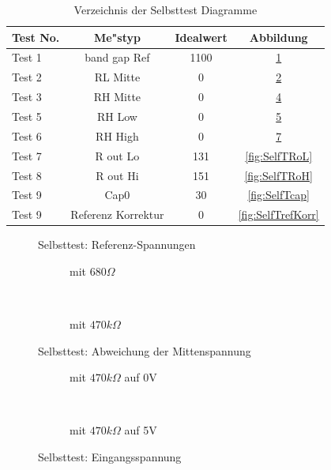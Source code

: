 \begin{table}[H]
  \begin{center}
    \begin{tabular}{| l | c | c | c |}
    \hline
Test No. &  Me"styp    & Idealwert & Abbildung \\
    \hline
    \hline
Test 1 & band gap Ref  & 1100 & \ref{fig:SelfTref} \\
    \hline
Test 2 & RL Mitte & 0 & \ref{fig:SelfTMitL} \\
    \hline
Test 3 & RH Mitte & 0 & \ref{fig:SelfTMitH} \\
    \hline
Test 5 & RH Low &  0 & \ref{fig:SelfTlowH} \\
    \hline
Test 6 & RH High & 0 & \ref{fig:SelfTtopH} \\
    \hline
Test 7 & R out Lo & 131 & \ref{fig:SelfTRoL} \\
    \hline
Test 8 & R out Hi & 151 & \ref{fig:SelfTRoH} \\
    \hline
Test 9 & Cap0  & 30 & \ref{fig:SelfTcap} \\
    \hline
Test 9 & Referenz Korrektur  & 0 & \ref{fig:SelfTrefKorr} \\
    \hline
    \end{tabular}
  \end{center}
  \caption{Verzeichnis der Selbsttest Diagramme}
  \label{tab:test_m168} 
\end{table}

\begin{figure}[H]
  \centering
  
  \caption{Selbsttest: Referenz-Spannungen}
  \label{fig:SelfTref}
\end{figure}

\begin{figure}[H]
  \begin{subfigure}[b]{9cm}
    \centering
    \resizebox{9cm}{!}{}
    \caption{mit \(680 \Omega\)}
    \label{fig:SelfTMitL}
  \end{subfigure}
  ~
  \begin{subfigure}[b]{9cm}
    \centering
    \resizebox{9cm}{!}{}
    \caption{mit \(470 k\Omega\)}
    \label{fig:SelfTMitH}
  \end{subfigure}
  \caption{Selbsttest: Abweichung der Mittenspannung}
\end{figure}

\begin{figure}[H]
  \begin{subfigure}[b]{9cm}
  \centering
    \resizebox{9cm}{!}{}
    \caption{mit \(470 k\Omega\) auf 0V}
    \label{fig:SelfTlowH}
  \end{subfigure}
  ~
  \begin{subfigure}[b]{9cm}
  \centering
    \resizebox{9cm}{!}{}
    \caption{mit \(470 k\Omega\) auf 5V}
    \label{fig:SelfTtopH}
  \end{subfigure}
  \caption{Selbsttest: Eingangsspannung}
\end{figure}

